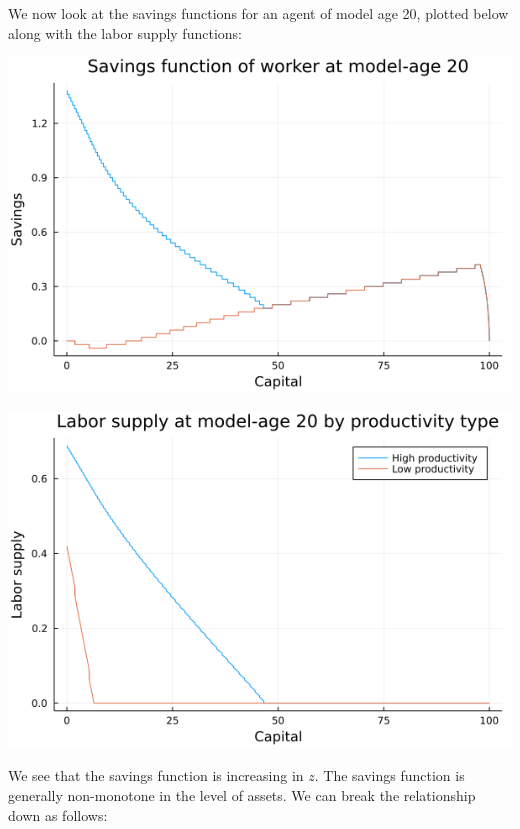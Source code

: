\documentclass[12pt]{article}
\begin{document}
We now look at the savings functions for an agent of model age 20, plotted below along with the labor supply functions:
\begin{center}
    \includegraphics[scale=0.5]{savplot20.png}
\end{center}
\begin{center}
    \includegraphics[scale=0.5]{labplot20.png}
\end{center}
We see that the savings function is increasing in $z$. The savings function is generally non-monotone in the level of assets. We can break the relationship down as follows:
\end{document}

